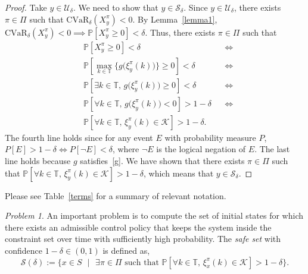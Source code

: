 \documentclass[letterpaper, 10 pt, conference]{ieeeconf}  %
\begin{document}
\begin{proof}
Take $y \in \mathcal{U}_\delta$. We need to show that $y \in \mathcal{S}_\delta$.
Since $y \in \mathcal{U}_\delta$, there exists $\pi \in \Pi$ such that $\text{CVaR}_\delta(X_y^\pi) < 0$.
By Lemma~\ref{lemma1}, $\text{CVaR}_\delta(X_y^\pi) < 0 \implies \mathbb{P}[X_y^\pi \geq 0] < \delta$.
Thus, there exists $\pi \in \Pi$ such that
\begin{equation}\begin{aligned}
& \mathbb{P}[X_y^\pi \geq 0] < \delta && \iff \\
& \mathbb{P}\left[{\underset{k \in \mathbb{T}}\max} \Big\{ g\big(\xi_y^\pi(k)\big) \Big\} \geq 0\right] < \delta && \iff \\
& \mathbb{P}\left[\exists k \in \mathbb{T}\text{, }g\big(\xi_y^\pi(k)\big) \geq 0 \right] < \delta && \iff \\
& \mathbb{P}\left[\forall k \in \mathbb{T}\text{, }g\big(\xi_y^\pi(k)\big) < 0 \right] > 1-\delta && \iff \\
& \mathbb{P}\left[\forall k \in \mathbb{T}\text{, } \xi_y^\pi(k) \in \mathcal{K} \right] > 1-\delta.
\end{aligned}\end{equation}
The fourth line holds since for any event $E$ with probability measure $P$, $P[E] > 1-\delta \iff P[\neg E] < \delta$,
where $\neg E$ is the logical negation of $E$. The last line holds because $g$ satisfies~\eqref{g}.
We have shown that there exists $\pi \in \Pi$ such that $\mathbb{P}\left[\forall k \in \mathbb{T}\text{, } \xi_y^\pi(k) \in \mathcal{K} \right] > 1-\delta$,
which means that $y \in \mathcal{S}_\delta$.


\end{proof}




Please see Table~\ref{terms} for a summary of relevant notation.

\textit{Problem 1}. An important problem is to compute the set of initial states for which there exists an admissible control policy that keeps
the system inside the constraint set over time with sufficiently high probability. The \textit{safe set} with confidence $1-\delta \in (0,1)$ is defined as,
\begin{equation}
\mathcal{S}(\delta) := \{ x \in S\text{ }|\text{ } \exists \pi \in \Pi \text{ such that } \mathbb{P}[ \forall k \in \mathbb{T}\text{, } \xi_x^\pi(k)\in \mathcal{K}] > 1-\delta \}.
\end{equation}
\end{document}

